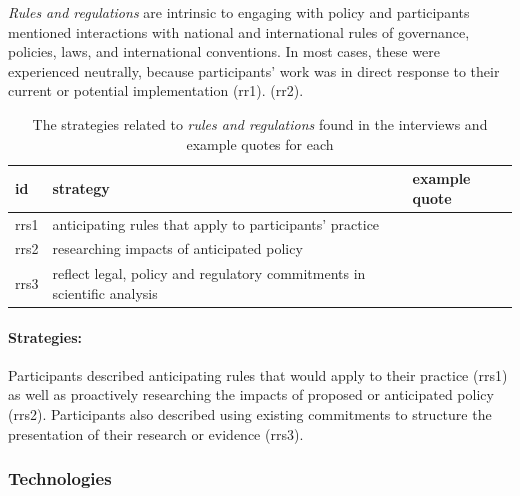\emph{Rules and regulations} are intrinsic to engaging with policy and participants mentioned interactions with national and international rules of governance, policies, laws, and international conventions. In most cases, these were experienced neutrally, because participants' work was in direct response to their current or potential implementation (rr1).  (rr2).

\begin{table}[!ht]
\footnotesize
\caption{The strategies related to \emph{rules and regulations} found in the interviews and example quotes for each}\label{tab:resrulesstrat}
\begin{tabular}{L{.06\linewidth}L{.3\linewidth}L{.64\linewidth}} \hline
\textbf{id} & \textbf{strategy} & \textbf{example quote} \\ \hline \hline
rrs1 & anticipating rules that apply to participants' practice &  \\[5mm]
rrs2 & researching impacts of anticipated policy &  \\[5mm]
rrs3 & reflect legal, policy and regulatory commitments in scientific analysis &  \\[5mm] \hline
 \end{tabular}
\end{table}

\paragraph{Strategies:} Participants described anticipating rules that would apply to their practice (rrs1) as well as proactively researching the impacts of proposed or anticipated policy (rrs2). Participants also described using existing commitments to structure the presentation of their research or evidence (rrs3).

\subsubsection{Technologies}\label{sec:restechnologies}

